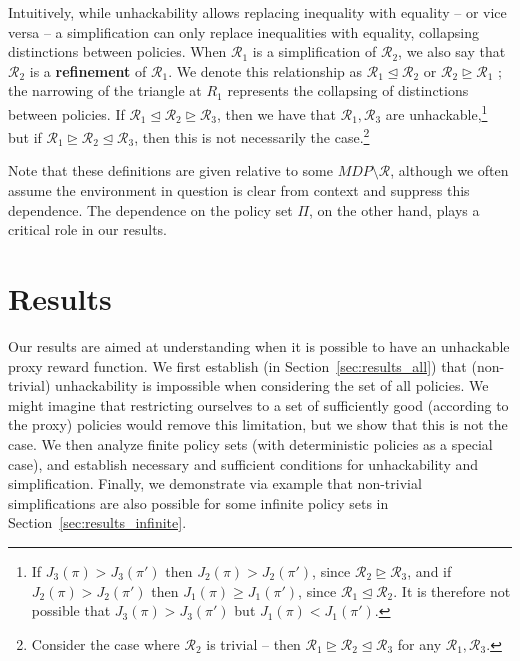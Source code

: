 \documentclass{article}
\theoremstyle{definition}
\theoremstyle{remark}
\begin{document}
Intuitively, while unhackability allows replacing inequality with equality -- or vice versa -- a simplification can only replace inequalities with equality, collapsing distinctions between policies.
When $\mathcal{R}_1$ is a simplification of $\mathcal{R}_2$, we also say that $\mathcal{R}_2$ is a \textbf{refinement} of $\mathcal{R}_1$.
We denote this relationship as $\mathcal{R}_1 \trianglelefteq \mathcal{R}_2$ or $\mathcal{R}_2 \trianglerighteq \mathcal{R}_1$ ; the narrowing of the triangle at $R_1$ represents the collapsing of distinctions between policies.
If $\mathcal{R}_1 \trianglelefteq \mathcal{R}_2 \trianglerighteq  \mathcal{R}_3$, then we have that $\mathcal{R}_1, \mathcal{R}_3$ are unhackable,\footnote{If $J_3(\pi) > J_3(\pi')$ then $J_2(\pi) > J_2(\pi')$, since $\mathcal{R}_2 \trianglerighteq  \mathcal{R}_3$, and if $J_2(\pi) > J_2(\pi')$ then $J_1(\pi) \geq J_1(\pi')$, since $\mathcal{R}_1 \trianglelefteq  \mathcal{R}_2$. It is therefore not possible that $J_3(\pi) > J_3(\pi')$ but $J_1(\pi) < J_1(\pi')$.} but if $\mathcal{R}_1 \trianglerighteq \mathcal{R}_2 \trianglelefteq \mathcal{R}_3$, then this is not necessarily the case.\footnote{Consider the case where $\mathcal{R}_2$ is trivial -- then $\mathcal{R}_1 \trianglerighteq \mathcal{R}_2 \trianglelefteq \mathcal{R}_3$ for any $\mathcal{R}_1, \mathcal{R}_3$.}

Note that these definitions are given relative to some $MDP \setminus \mathcal{R}$, although we often assume the environment in question is clear from context and suppress this dependence. The dependence on the policy set $\Pi$, on the other hand, plays a critical role in our results.







\section{Results}

Our results are aimed at understanding when it is possible to have an unhackable proxy reward function.
We first establish (in Section~\ref{sec:results_all}) that (non-trivial) unhackability is impossible when considering the set of all policies.
We might imagine that restricting ourselves to a set of sufficiently good (according to the proxy) policies would remove this limitation, but we show that this is not the case.
We then analyze finite policy sets (with deterministic policies as a special case), and  establish necessary and sufficient conditions for unhackability and simplification.
Finally, we demonstrate via example that non-trivial simplifications are also possible for some infinite policy sets in Section~\ref{sec:results_infinite}.
\end{document}
